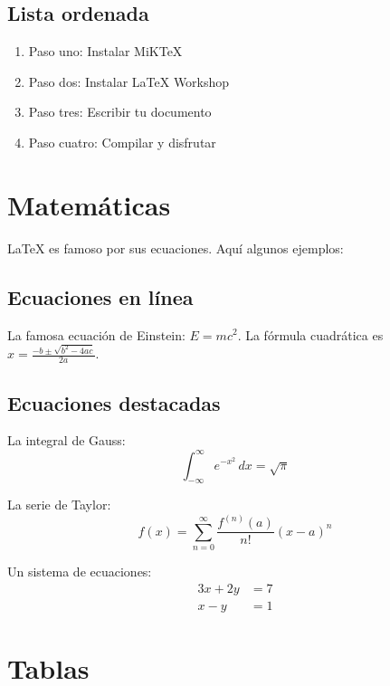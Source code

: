 \documentclass[12pt, a4paper]{article}
\begin{document}
\subsection{Lista ordenada}
\begin{enumerate}
    \item Paso uno: Instalar MiKTeX
    \item Paso dos: Instalar LaTeX Workshop
    \item Paso tres: Escribir tu documento
    \item Paso cuatro: Compilar y disfrutar
\end{enumerate}

\section{Matemáticas}

\LaTeX{} es famoso por sus ecuaciones. Aquí algunos ejemplos:

\subsection{Ecuaciones en línea}
La famosa ecuación de Einstein: $E = mc^2$. La fórmula cuadrática es $x = \frac{-b \pm \sqrt{b^2 - 4ac}}{2a}$.

\subsection{Ecuaciones destacadas}
La integral de Gauss:
\begin{equation}
    \int_{-\infty}^{\infty} e^{-x^2} \, dx = \sqrt{\pi}
\end{equation}

La serie de Taylor:
\begin{equation}
    f(x) = \sum_{n=0}^{\infty} \frac{f^{(n)}(a)}{n!} (x - a)^n
\end{equation}

Un sistema de ecuaciones:
\begin{align}
    3x + 2y &= 7 \\
    x - y &= 1
\end{align}

\section{Tablas}
\end{document}
